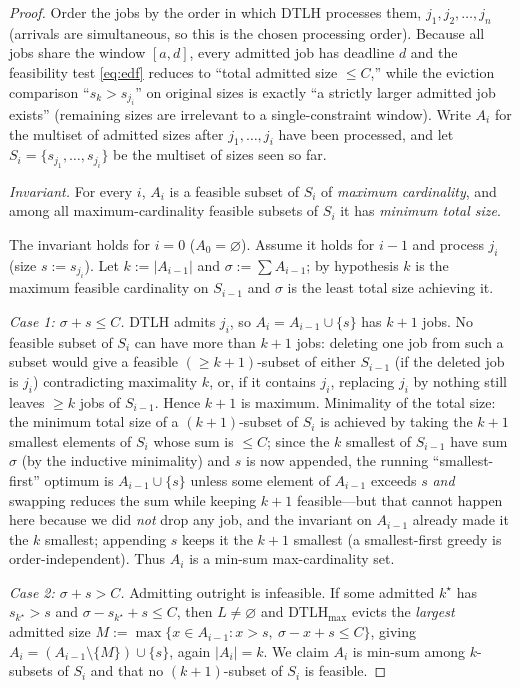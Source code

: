 \documentclass{amsart}
\theoremstyle{definition}
\begin{document}
\begin{proof}
Order the jobs by the order in which DTLH processes them, $j_1,j_2,\dots,j_n$
(arrivals are simultaneous, so this is the chosen processing order). Because all
jobs share the window $[a,d]$, every admitted job has deadline $d$ and the
feasibility test \eqref{eq:edf} reduces to ``total admitted size $\le C$,'' while
the eviction comparison ``$s_k>s_{j_i}$'' on original sizes is exactly ``a
strictly larger admitted job exists'' (remaining sizes are irrelevant to a
single-constraint window). Write $A_i$ for the multiset of admitted sizes after
$j_1,\dots,j_i$ have been processed, and let $S_i=\{s_{j_1},\dots,s_{j_i}\}$ be
the multiset of sizes seen so far.

\emph{Invariant.} For every $i$, $A_i$ is a feasible subset of $S_i$ of
\emph{maximum cardinality}, and among all maximum-cardinality feasible subsets of
$S_i$ it has \emph{minimum total size}.

The invariant holds for $i=0$ ($A_0=\varnothing$). Assume it holds for $i-1$ and
process $j_i$ (size $s:=s_{j_i}$). Let $k:=|A_{i-1}|$ and $\sigma:=\sum A_{i-1}$;
by hypothesis $k$ is the maximum feasible cardinality on $S_{i-1}$ and $\sigma$ is
the least total size achieving it.

\emph{Case 1: $\sigma+s\le C$.} DTLH admits $j_i$, so $A_i=A_{i-1}\cup\{s\}$ has
$k+1$ jobs. No feasible subset of $S_i$ can have more than $k+1$ jobs: deleting
one job from such a subset would give a feasible $(\ge k+1)$-subset of either
$S_{i-1}$ (if the deleted job is $j_i$) contradicting maximality $k$, or, if it
contains $j_i$, replacing $j_i$ by nothing still leaves $\ge k$ jobs of
$S_{i-1}$. Hence $k+1$ is maximum. Minimality of the total size: the minimum total
size of a $(k+1)$-subset of $S_i$ is achieved by taking the $k+1$ smallest
elements of $S_i$ whose sum is $\le C$; since the $k$ smallest of $S_{i-1}$ have
sum $\sigma$ (by the inductive minimality) and $s$ is now appended, the running
``smallest-first'' optimum is $A_{i-1}\cup\{s\}$ unless some element of $A_{i-1}$
exceeds $s$ \emph{and} swapping reduces the sum while keeping $k+1$ feasible---but
that cannot happen here because we did \emph{not} drop any job, and the invariant
on $A_{i-1}$ already made it the $k$ smallest; appending $s$ keeps it the $k+1$
smallest (a smallest-first greedy is order-independent). Thus $A_i$ is a
min-sum max-cardinality set.

\emph{Case 2: $\sigma+s>C$.} Admitting outright is infeasible. If some admitted
$k^\star$ has $s_{k^\star}>s$ and $\sigma-s_{k^\star}+s\le C$, then $L\neq
\varnothing$ and $\mathrm{DTLH}_{\max}$ evicts the \emph{largest} admitted size
$M:=\max\{x\in A_{i-1}: x>s,\ \sigma-x+s\le C\}$, giving
$A_i=(A_{i-1}\setminus\{M\})\cup\{s\}$, again $|A_i|=k$. We claim $A_i$ is
min-sum among $k$-subsets of $S_i$ and that no $(k+1)$-subset of $S_i$ is
feasible.


\end{proof}
\end{document}
